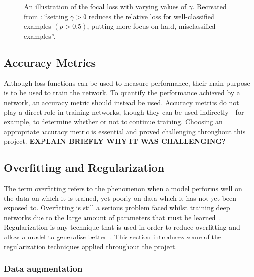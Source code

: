 \begin{figure}[t]
    \centering
    
    \caption{An illustration of the focal loss with varying values of $\gamma$. Recreated from \cite[Fig. 1]{focalloss}: ``setting $\gamma > 0$ reduces the relative loss for well-classified examples $(p > 0.5)$, putting more focus on hard, misclassified examples''.}
    \label{fig:focal}
\end{figure}

\subsection{Accuracy Metrics}

Although loss functions can be used to measure performance, their main purpose is to be used to train the network. To quantify the performance achieved by a network, an accuracy metric should instead be used. Accuracy metrics do not play a direct role in training networks, though they can be used indirectly---for example, to determine whether or not to continue training. Choosing an appropriate accuracy metric is essential and proved challenging throughout this project. \textbf{EXPLAIN BRIEFLY WHY IT WAS CHALLENGING?}


\subsection{Overfitting and Regularization}
\label{sec:regularization}

The term overfitting refers to the phenomenon when a model performs well on the data on which it is trained, yet poorly on data which it has not yet been exposed to. Overfitting is still a serious problem faced whilst training deep networks due to the large amount of parameters that must be learned~\cite{dropout, reducing, overfitavoid}. Regularization is any technique that is used in order to reduce overfitting and allow a model to generalise better~\cite{regular}. This section introduces some of the regularization techniques applied throughout the project.

\subsubsection{Data augmentation}

